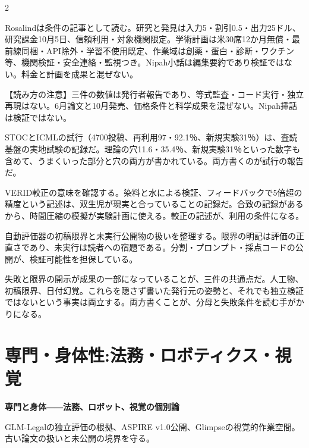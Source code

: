 \documentclass[lualatex,a4paper,10pt]{jlreq}
\begin{document}
\begin{multicols}{2} %

Rosalindは条件の記事として読む。研究と発見は入力5・割引0.5・出力25ドル、研究課金10月5日、信頼利用・対象機関限定。学術計画は米30席12か月無償・最前線同梱・API除外・学習不使用既定、作業域は創薬・蛋白・診断・ワクチン等、機関検証・安全連絡・監視つき。Nipah小話は編集要約であり検証ではない。料金と計画を成果と混ぜない。
\cite{B51,B52,B86,B87}


\begin{tcolorbox}[colback=SurveySoft,colframe=SurveyRule,arc=1mm,boxrule=0.4pt,left=2mm,right=2mm]
【読み方の注意】三件の数値は発行者報告であり、等式監査・コード実行・独立再現はない。6月論文と10月発売、価格条件と科学成果を混ぜない。Nipah挿話は検証ではない。
\end{tcolorbox}
\cite{B46,B83,B44,B43,B45,B47,B84,B48,B50,B85,B49,B51,B86,B52,B87}

STOCとICMLの試行（4700投稿、再利用97・92.1％、新規実験31％）は、査読基盤の実地試験の記録だ。理論の穴11.6・35.4％、新規実験31％といった数字も含めて、うまくいった部分と穴の両方が書かれている。両方書くのが試行の報告だ。
\cite{B50,B85,B49}


VERID較正の意味を確認する。染料と水による検証、フィードバックで5倍超の精度という記述は、双生児が現実と合っていることの記録だ。合致の記録があるから、時間圧縮の模擬が実験計画に使える。較正の記述が、利用の条件になる。
\cite{B46,B83,B44,B43,B45}


自動評価器の初稿限界と未実行公開物の扱いを整理する。限界の明記は評価の正直さであり、未実行は読者への宿題である。分割・プロンプト・採点コードの公開が、検証可能性を担保している。
\cite{B47,B84,B48}


失敗と限界の開示が成果の一部になっていることが、三件の共通点だ。人工物、初稿限界、日付幻覚。これらを隠さず書いた発行元の姿勢と、それでも独立検証ではないという事実は両立する。両方書くことが、分母と失敗条件を読む手がかりになる。
\cite{B46,B83,B44,B43,B45,B47,B84,B48,B50,B85,B49}


\section{専門・身体性:法務・ロボティクス・視覚}
\label{sec:P7}

{\Large\bfseries 専門と身体――法務、ロボット、視覚の個別論\par}
\smallskip
{\color{SurveyMuted}GLM-Legalの独立評価の根拠、ASPIRE v1.0公開、Glimpseの視覚的作業空間。古い論文の扱いと未公開の境界を守る。\par}
\bigskip


\end{multicols}
\end{document}
